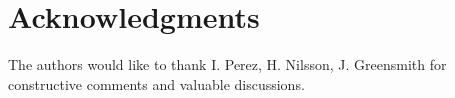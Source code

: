 \section*{Acknowledgments}
The authors would like to thank I. Perez, H. Nilsson, J. Greensmith for constructive comments and valuable discussions.

